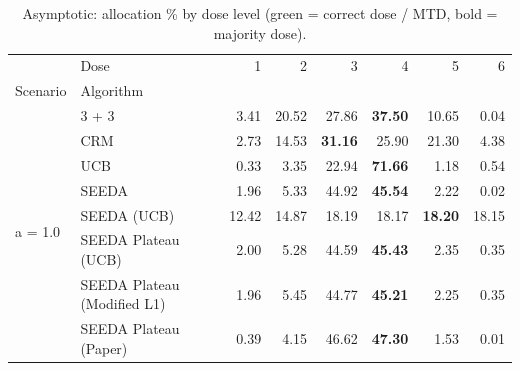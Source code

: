 \begin{table}[H]
\centering
\caption{Asymptotic: allocation \% by dose level (green = correct dose / MTD, bold = majority dose).}
\label{tab:asym_alloc_by_dose}
\begin{tabular}{llrrrrrr}
\toprule
 & Dose & 1 & 2 & 3 & 4 & 5 & 6 \\
Scenario & Algorithm &  &  &  &  &  &  \\
\midrule
\multirow[c]{8}{*}{a = 1.0} & 3 + 3 & 3.41 & 20.52 & {\cellcolor[HTML]{C8E6C9}} 27.86 & \bfseries 37.50 & 10.65 & 0.04 \\
 & CRM & 2.73 & 14.53 & {\cellcolor[HTML]{C8E6C9}} \bfseries 31.16 & 25.90 & 21.30 & 4.38 \\
 & UCB & 0.33 & 3.35 & {\cellcolor[HTML]{C8E6C9}} 22.94 & \bfseries 71.66 & 1.18 & 0.54 \\
 & SEEDA & 1.96 & 5.33 & {\cellcolor[HTML]{C8E6C9}} 44.92 & \bfseries 45.54 & 2.22 & 0.02 \\
 & SEEDA (UCB) & 12.42 & 14.87 & {\cellcolor[HTML]{C8E6C9}} 18.19 & 18.17 & \bfseries 18.20 & 18.15 \\
 & SEEDA Plateau (UCB) & 2.00 & 5.28 & {\cellcolor[HTML]{C8E6C9}} 44.59 & \bfseries 45.43 & 2.35 & 0.35 \\
 & SEEDA Plateau (Modified L1) & 1.96 & 5.45 & {\cellcolor[HTML]{C8E6C9}} 44.77 & \bfseries 45.21 & 2.25 & 0.35 \\
 & SEEDA Plateau (Paper) & 0.39 & 4.15 & {\cellcolor[HTML]{C8E6C9}} 46.62 & \bfseries 47.30 & 1.53 & 0.01 \\
\bottomrule
\end{tabular}
\end{table}
